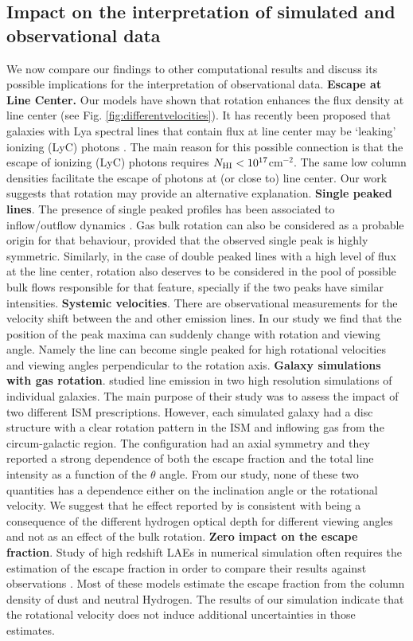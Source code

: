 \subsection{Impact on the interpretation of simulated and
observational data}
We now compare our findings to other computational results and discuss
its possible implications for the interpretation of observational data.
{\bf Escape at Line Center.} Our models have shown that rotation
enhances the flux density at line center (see Fig. \ref{fig:differentvelocities}). It has
recently been proposed that galaxies with Lya spectral lines that
contain flux at line center may be `leaking' ionizing (LyC) photons
\citep{Behrens2014,2014arXiv1404.2958V}. The main reason for this possible
connection is that the escape of ionizing (LyC) photons requires
$N_{\rm HI} < 10^{17} $cm$^{-2}$. The same low column densities facilitate the escape of
\ly photons at (or close to) line center. Our work suggests that
rotation may provide an alternative explanation.
{\bf Single peaked lines}. The presence of single peaked profiles has
been associated to inflow/outflow dynamics
\citep{Verhamme06,DijkstraKramer}.
Gas bulk rotation can also be considered as a probable origin for that
behaviour, provided that the observed single peak is highly
symmetric.
Similarly, in the case of double peaked lines with a high
level of flux at the line center, rotation also deserves to be
considered in the pool of possible bulk flows responsible for that feature,
specially if the two peaks have similar intensities.
{\bf Systemic velocities}. There are observational measurements for the
velocity shift between the \ly and other emission lines. In our study
we find that the position of the peak maxima can suddenly change with
rotation and viewing angle. Namely the line can become single peaked
for high rotational velocities and viewing angles perpendicular to the
rotation axis.
{\bf Galaxy simulations with gas rotation}. \cite{Verhamme12} studied \ly
line emission in two high resolution simulations of individual
galaxies.
The main purpose of their study was to assess the impact of two
different ISM prescriptions.
However, each simulated galaxy had a disc structure with a clear rotation pattern in
the ISM and inflowing gas from the circum-galactic region.
The configuration had an axial symmetry and they reported a strong dependence of both
the escape fraction and the total line intensity as a function of the
$\theta$ angle.
From our study, none of these two quantities has a dependence either
on the inclination angle or the rotational velocity.
We suggest that he effect reported by \cite{Verhamme12} is
consistent with being a consequence of the different hydrogen optical
depth for different viewing angles and not as an effect of the bulk
rotation.
{\bf Zero impact on the \ly escape fraction}. Study of
high redshift LAEs in numerical simulation often requires the
estimation of the \ly escape fraction in order to compare their
results against observations
\citep{CLARA,Dayal2012,Forero12,Orsi12,Garel2012}. Most of these
models estimate the escape fraction from the column density of dust and
neutral Hydrogen. The results of our simulation indicate that the
rotational velocity does not induce additional uncertainties in those
estimates.


